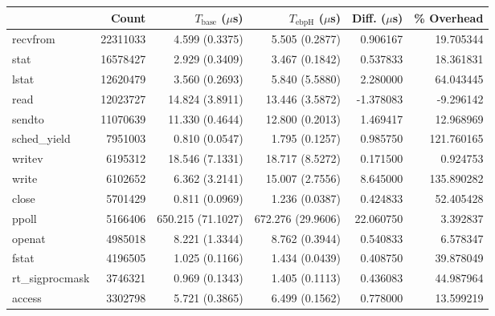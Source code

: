 \begin{tabular}{>{\ttfamily}lrrrrr}
\toprule
\multicolumn{1}{l}{System Call} &     Count & $T_\text{base}$ ($\mu$s) & $T_\text{ebpH}$ ($\mu$s) &  Diff. ($\mu$s) &  \% Overhead \\
\midrule
                       recvfrom &  22311033 &           4.599 (0.3375) &           5.505 (0.2877) &        0.906167 &    19.705344 \\
                           stat &  16578427 &           2.929 (0.3409) &           3.467 (0.1842) &        0.537833 &    18.361831 \\
                          lstat &  12620479 &           3.560 (0.2693) &           5.840 (5.5880) &        2.280000 &    64.043445 \\
                           read &  12023727 &          14.824 (3.8911) &          13.446 (3.5872) &       -1.378083 &    -9.296142 \\
                         sendto &  11070639 &          11.330 (0.4644) &          12.800 (0.2013) &        1.469417 &    12.968969 \\
                   sched\_yield &   7951003 &           0.810 (0.0547) &           1.795 (0.1257) &        0.985750 &   121.760165 \\
                         writev &   6195312 &          18.546 (7.1331) &          18.717 (8.5272) &        0.171500 &     0.924753 \\
                          write &   6102652 &           6.362 (3.2141) &          15.007 (2.7556) &        8.645000 &   135.890282 \\
                          close &   5701429 &           0.811 (0.0969) &           1.236 (0.0387) &        0.424833 &    52.405428 \\
                          ppoll &   5166406 &        650.215 (71.1027) &        672.276 (29.9606) &       22.060750 &     3.392837 \\
                         openat &   4985018 &           8.221 (1.3344) &           8.762 (0.3944) &        0.540833 &     6.578347 \\
                          fstat &   4196505 &           1.025 (0.1166) &           1.434 (0.0439) &        0.408750 &    39.878049 \\
                rt\_sigprocmask &   3746321 &           0.969 (0.1343) &           1.405 (0.1113) &        0.436083 &    44.987964 \\
                         access &   3302798 &           5.721 (0.3865) &           6.499 (0.1562) &        0.778000 &    13.599219 \\

\end{tabular}

